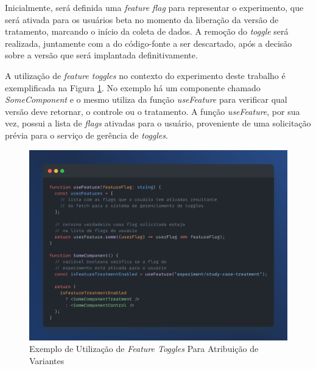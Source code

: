 Inicialmente, será definida uma \textit{feature flag} para representar o experimento, que será ativada para os usuários beta no momento da liberação da versão de tratamento, marcando o início da coleta de dados. A remoção do \textit{toggle} será realizada, juntamente com a do código-fonte a ser descartado, após a decisão sobre a versão que será implantada definitivamente.

A utilização de \textit{feature toggles} no contexto do experimento deste trabalho é exemplificada na Figura \ref{fig:toggle}. No exemplo há um componente chamado \textit{SomeComponent} e o mesmo utiliza da função \textit{useFeature} para verificar qual versão deve retornar, o controle ou o tratamento. A função \textit{useFeature}, por sua vez, possui a lista de \textit{flags} ativadas para o usuário, proveniente de uma solicitação prévia para o serviço de gerência de \textit{toggles}.


\begin{figure}
    \centering
    \caption{Exemplo de Utilização de \textit{Feature Toggles} Para Atribuição de Variantes}
    \includegraphics[width=1\linewidth]{figuras/toggle.png}
    \begin{center}
    \end{center}
    \label{fig:toggle}
\end{figure}